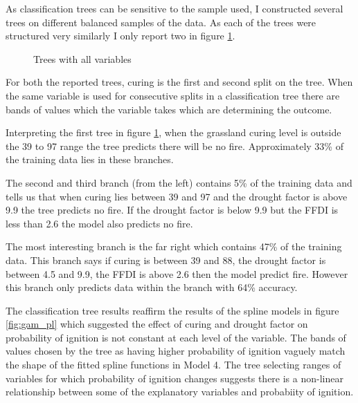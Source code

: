 \documentclass[11pt,a4paper]{article}
\begin{document}
As classification trees can be sensitive to the sample used, I constructed several trees on different balanced samples of the data. As each of the trees were structured very similarly I only report two in figure \ref{fig:tree2}. 

\begin{figure}[h]
	\centering 
	\caption{Trees with all variables} 
	\label{fig:tree2} 
\end{figure}

For both the reported trees, curing is the first and second split on the tree. When the same variable is used for consecutive splits in a classification tree there are bands of values which the variable takes which are determining the outcome. 

Interpreting the first tree in figure \ref{fig:tree2}, when the grassland curing level is outside the 39 to 97 range the tree predicts there will be no fire. Approximately 33\% of the training data lies in these branches. 

The second and third branch (from the left) contains 5\% of the training data and tells us that when curing lies between 39 and 97 and the drought factor is above 9.9 the tree predicts no fire. If the drought factor is below 9.9 but the FFDI is less than 2.6 the model also predicts no fire. 

The most interesting branch is the far right which contains 47\% of the training data. This branch says if curing is between 39 and 88, the drought factor is between 4.5 and 9.9, the FFDI is above 2.6 then the model predict fire. However this branch only predicts data within the branch with 64\% accuracy. 

The classification tree results reaffirm the results of the spline models in figure \ref{fig:gam_pl} which suggested the effect of curing and drought factor on probability of ignition is not constant at each level of the variable. The bands of values chosen by the tree as having higher probability of ignition vaguely match the shape of the fitted spline functions in Model 4. The tree selecting ranges of variables for which probability of ignition changes suggests there is a  non-linear relationship between some of the explanatory variables and probabiity of ignition. 

\end{document}
